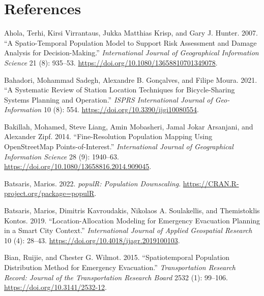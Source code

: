\hypertarget{references}{%
\section*{References}\label{references}}

\hypertarget{refs}{}
\begin{CSLReferences}{1}{0}
\leavevmode{}%
Ahola, Terhi, Kirsi Virrantaus, Jukka Matthias Krisp, and Gary J. Hunter. 2007. {``A Spatio-Temporal Population Model to Support Risk Assessment and Damage Analysis for Decision-Making.''} \emph{International Journal of Geographical Information Science} 21 (8): 935--53. \url{https://doi.org/10.1080/13658810701349078}.

\leavevmode{}%
Bahadori, Mohammad Sadegh, Alexandre B. Gonçalves, and Filipe Moura. 2021. {``A Systematic Review of Station Location Techniques for Bicycle-Sharing Systems Planning and Operation.''} \emph{ISPRS International Journal of Geo-Information} 10 (8): 554. \url{https://doi.org/10.3390/ijgi10080554}.

\leavevmode{}%
Bakillah, Mohamed, Steve Liang, Amin Mobasheri, Jamal Jokar Arsanjani, and Alexander Zipf. 2014. {``Fine-Resolution Population Mapping Using OpenStreetMap Points-of-Interest.''} \emph{International Journal of Geographical Information Science} 28 (9): 1940--63. \url{https://doi.org/10.1080/13658816.2014.909045}.

\leavevmode{}%
Batsaris, Marios. 2022. \emph{{populR}: Population Downscaling}. \url{https://CRAN.R-project.org/package=populR}.

\leavevmode{}%
Batsaris, Marios, Dimitris Kavroudakis, Nikolaos A. Soulakellis, and Themistoklis Kontos. 2019. {``Location-Allocation Modeling for Emergency Evacuation Planning in a Smart City Context.''} \emph{International Journal of Applied Geospatial Research} 10 (4): 28--43. \url{https://doi.org/10.4018/ijagr.2019100103}.

\leavevmode{}%
Bian, Ruijie, and Chester G. Wilmot. 2015. {``Spatiotemporal Population Distribution Method for Emergency Evacuation.''} \emph{Transportation Research Record: Journal of the Transportation Research Board} 2532 (1): 99--106. \url{https://doi.org/10.3141/2532-12}.


\end{CSLReferences}

